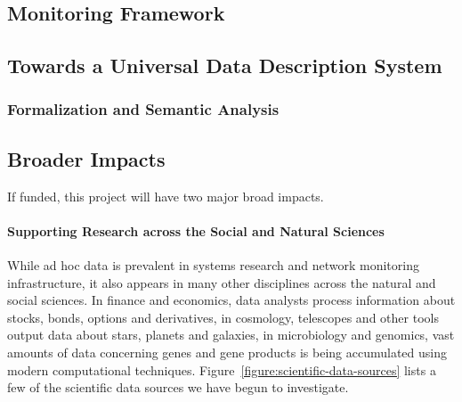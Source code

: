 \documentclass[11pt]{article}
\begin{document}
\subsection{Monitoring Framework}


\subsection{Towards a Universal Data Description System}


\subsubsection{Formalization and Semantic Analysis}


\subsection{Broader Impacts}
\label{ssec:impact}

If funded, this project will have two major broad impacts.

\paragraph*{Supporting Research across the Social and Natural Sciences}
While ad hoc data is prevalent in systems research and network monitoring
infrastructure, it also appears in many other disciplines
across the natural and social sciences. In finance and economics,
data analysts process information about stocks, bonds, options and derivatives,
in cosmology, telescopes and other tools output data about stars, planets and
galaxies, in microbiology and genomics, vast amounts of data concerning
genes and gene products is being accumulated using modern computational techniques.
Figure~\ref{figure:scientific-data-sources} lists a few of the scientific data sources
we have begun to investigate.
\end{document}
